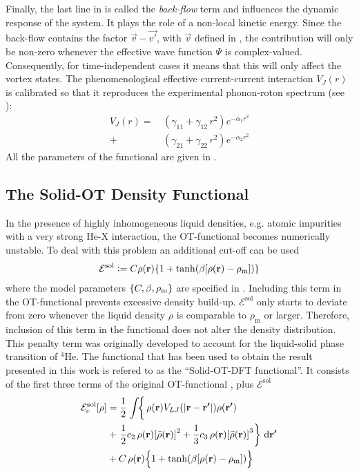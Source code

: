 		Finally, the last line in  is called the \emph{back-flow} term and influences the dynamic response of the system. It plays the role of a non-local kinetic energy. Since the back-flow contains the factor $\vec{v}-\vec{v'}$, with $\vec{v}$ defined in , the contribution will only be non-zero whenever the effective wave function $\Psi$ is complex-valued. Consequently, for time-independent cases it means that this will only affect the vortex states. The phenomenological effective current-current interaction $V_J(r)$ is calibrated so that it reproduces the experimental phonon-roton spectrum (see ):
		\begin{align}
			V_J(r) =\,&(\gamma_{11} +\gamma_{12} \, r^2) e^{-\alpha_1 r^2} \nonumber \\
				+\,&(\gamma_{21} +\gamma_{22} \, r^2) e^{-\alpha_2 r^2}
		\end{align}
		All the parameters of the functional are given in .

		\subsection{The Solid-OT Density Functional}
			In the presence of highly inhomogeneous liquid densities, e.g. atomic impurities with a very strong He-X interaction, the OT-functional  becomes numerically unstable. To deal with this problem an additional cut-off can be used
			\begin{align}
				\mathcal{E}^\mathrm{sol} \vcentcolon= C\rho(\bm{\mathrm{r}})\qty{1+\tanh(\beta\qty[\rho(\bm{\mathrm{r}})-\rho_\mathrm{m}])}
			\end{align}
			where the model parameters $\qty{C,\beta,\rho_\mathrm{m}}$ are specified in . Including this term in the OT-functional prevents excessive density build-up. $\mathcal{E}^\mathrm{sol}$ only starts to deviate from zero whenever the liquid density $\rho$ is comparable to $\rho_\mathrm{m}$ or larger. Therefore, inclusion of this term in the functional does not alter the density distribution. This penalty term was originally developed to account for the liquid-solid phase transition of $^4$He\citep{Anc05a,Cau07}. The functional that has been used to obtain the result presented in this work is refered to as the ``Solid-OT-DFT functional''. It consists of the first three terms of the original OT-functional , plus $\mathcal{E}^\mathrm{sol}$
			\begin{align}
				\mathcal{E}_c^\mathrm{sol}[\rho] &=  
				\frac{1}{2} \left.\int \! \right\{\rho(\bm{\mathrm{r}}) V_{LJ}(\abs{\bm{\mathrm{r}}-\bm{\mathrm{r'}}}) \rho(\bm{\mathrm{r'}}) \nonumber \\
				&+ \left.\frac{1}{2} c_2\, \rho(\bm{\mathrm{r}}) \qty[\bar\rho(\bm{\mathrm{r}})]^2 
				+ \frac{1}{3} c_3 \, \rho(\bm{\mathrm{r}}) \qty[\bar\rho(\bm{\mathrm{r}})]^3\right\}\,\mathrm{d}{\bm{\mathrm{r'}}} \nonumber \\
				&+ C\,\rho(\bm{\mathrm{r}})\qty\Big{1+\tanh(\beta\qty[\rho(\bm{\mathrm{r}})-\rho_\mathrm{m}])} \label{eq:solid-otf}
			\end{align}

